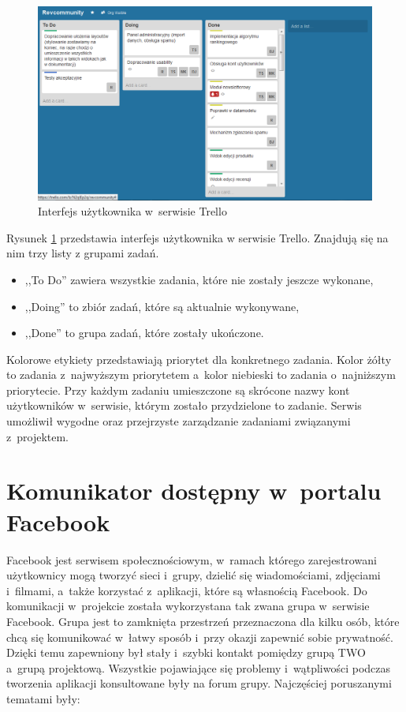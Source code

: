 \begin{figure}[H]
	\centering
	\includegraphics[width=1.00\textwidth]{images/trello.png}
	\caption{Interfejs użytkownika w~serwisie Trello}
	\label{fig:trello}
\end{figure}

Rysunek \ref{fig:trello} przedstawia interfejs użytkownika w serwisie Trello. Znajdują się na nim trzy listy z grupami zadań.

\begin{itemize}
\item ,,To Do'' zawiera wszystkie zadania, które nie zostały jeszcze wykonane,
\item ,,Doing'' to zbiór zadań, które są aktualnie wykonywane,
\item ,,Done'' to grupa zadań, które zostały ukończone.
\end{itemize}


Kolorowe etykiety przedstawiają priorytet dla konkretnego zadania. Kolor żółty to zadania z~najwyższym priorytetem a~kolor niebieski to zadania o~najniższym priorytecie. Przy każdym zadaniu umieszczone są skrócone nazwy kont użytkowników w~serwisie, którym zostało przydzielone to zadanie. 
Serwis umożliwił wygodne oraz przejrzyste zarządzanie zadaniami związanymi z~projektem.

\section{Komunikator dostępny w~portalu Facebook}
Facebook jest serwisem społecznościowym, w~ramach którego zarejestrowani użytkownicy mogą tworzyć sieci i~grupy, dzielić się wiadomościami, zdjęciami i~filmami, a~także korzystać z~aplikacji, które są własnością Facebook.\cite{face} Do komunikacji w~projekcie została wykorzystana tak zwana grupa w~serwisie Facebook. Grupa  jest to zamknięta przestrzeń przeznaczona dla kilku osób, które chcą się komunikować w~łatwy sposób i~przy okazji zapewnić sobie prywatność. Dzięki temu zapewniony był stały i~szybki kontakt pomiędzy grupą TWO a~grupą projektową. Wszystkie pojawiające się problemy i~wątpliwości podczas tworzenia aplikacji konsultowane były na forum grupy. Najczęściej poruszanymi tematami były:


